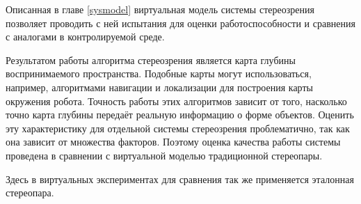 Описанная в главе \ref{sysmodel} виртуальная модель системы стереозрения позволяет проводить 
с ней испытания для оценки работоспособности и сравнения с аналогами в контролируемой среде.           

Результатом работы алгоритма стереозрения является карта глубины воспринимаемого пространства. Подобные карты могут
использоваться, например, алгоритмами навигации и локализации для построения карты окружения робота. Точность работы 
этих алгоритмов зависит от того, насколько точно карта глубины передаёт реальную информацию о форме объектов. Оценить 
эту характеристику для отдельной системы стереозрения проблематично, так как она зависит от множества факторов.         %
Поэтому оценка качества работы системы проведена в сравнении с виртуальной моделью традиционной стереопары.

Здесь в виртуальных экспериментах для сравнения так же применяется эталонная стереопара.  %

